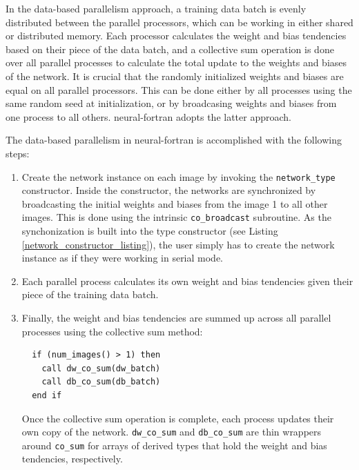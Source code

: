 \documentclass[sigplan, review=false, screen=true, balance=true]{acmart}
\begin{document}
In the data-based parallelism approach, a training data batch is evenly distributed
between the parallel processors, which can be working in either
shared or distributed memory. Each processor calculates the weight and
bias tendencies based on their piece of the data batch, and a collective
sum operation is done over all parallel processes to calculate the
total update to the weights and biases of the network.
It is crucial that the randomly initialized weights and
biases are equal on all parallel processors.
This can be done either by all processes using the same random seed
at initialization, or by broadcasing weights and biases from one process to all
others. neural-fortran adopts the latter approach.

The data-based parallelism in neural-fortran is accomplished with the
following steps:

\begin{enumerate}

  \item Create the network instance on each image by invoking the
  \lstinline{network_type} constructor. Inside the constructor, the networks
  are synchronized by broadcasting the initial weights and biases from the
  image 1 to all other images. This is done using the intrinsic
  \lstinline{co_broadcast} subroutine. As the synchonization is built into the
  type constructor (see Listing \ref{network_constructor_listing}), the user
  simply has to create the network instance as if they were working in serial mode.

  \item Each parallel process calculates its own weight and bias tendencies given
  their piece of the training data batch.

  \item Finally, the weight and bias tendencies are summed up across all parallel
  processes using the collective sum method:

  \begin{minipage}{\linewidth}
  \begin{lstlisting}
  if (num_images() > 1) then
    call dw_co_sum(dw_batch)
    call db_co_sum(db_batch)
  end if
  \end{lstlisting}
  \end{minipage}

  Once the collective sum operation is complete, each process updates their
  own copy of the network. \lstinline{dw_co_sum} and \lstinline{db_co_sum} are
  thin wrappers around \lstinline{co_sum} for arrays of derived types that
  hold the weight and bias tendencies, respectively.

\end{enumerate}
\end{document}
